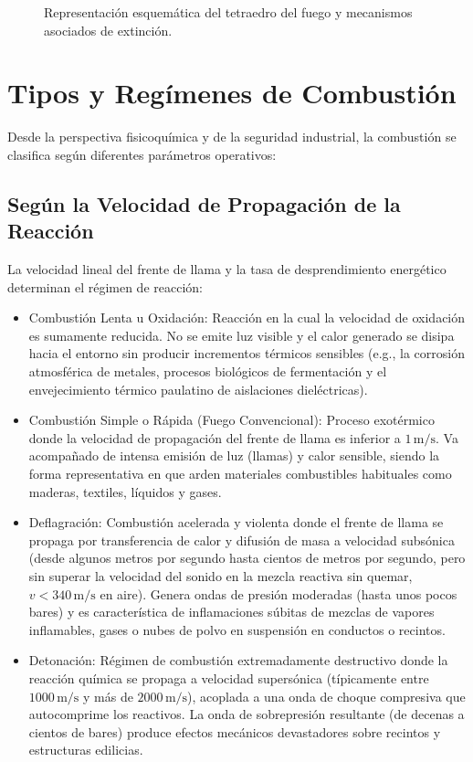 \begin{figure}[!ht]
    \centering
    
    \caption{Representación esquemática del tetraedro del fuego y mecanismos asociados de extinción.}
    \label{fig.cap2:tetraedro}
\end{figure}

\section{Tipos y Regímenes de Combustión}
\label{sec.cap2:tipos_combustion}

Desde la perspectiva fisicoquímica y de la seguridad industrial, la combustión se clasifica según diferentes parámetros
operativos:

\subsection{Según la Velocidad de Propagación de la Reacción}

La velocidad lineal del frente de llama y la tasa de desprendimiento energético determinan el régimen de reacción:

\begin{itemize}
    \item Combustión Lenta u Oxidación: Reacción en la cual la velocidad de oxidación es sumamente reducida. No se emite
          luz visible y el calor generado se disipa hacia el entorno sin producir incrementos térmicos sensibles (e.g.,
          la corrosión atmosférica de metales, procesos biológicos de fermentación y el envejecimiento térmico paulatino
          de aislaciones dieléctricas).
    \item Combustión Simple o Rápida (Fuego Convencional): Proceso exotérmico donde la velocidad de propagación del frente
          de llama es inferior a $1\,\mathrm{m/s}$. Va acompañado de intensa emisión de luz (llamas) y calor sensible,
          siendo la forma representativa en que arden materiales combustibles habituales como maderas, textiles, líquidos y
          gases.
    \item Deflagración: Combustión acelerada y violenta donde el frente de llama se propaga por transferencia de calor y
          difusión de masa a velocidad subsónica (desde algunos metros por segundo hasta cientos de metros por segundo,
          pero sin superar la velocidad del sonido en la mezcla reactiva sin quemar, $v < 340\,\mathrm{m/s}$ en aire). Genera
          ondas de presión moderadas (hasta unos pocos bares) y es característica de inflamaciones súbitas de mezclas de
          vapores inflamables, gases o nubes de polvo en suspensión en conductos o recintos.
    \item Detonación: Régimen de combustión extremadamente destructivo donde la reacción química se propaga a velocidad
          supersónica (típicamente entre $1000\,\mathrm{m/s}$ y más de $2000\,\mathrm{m/s}$), acoplada a una onda de
          choque compresiva que autocomprime los reactivos. La onda de sobrepresión resultante (de decenas a cientos de
          bares) produce efectos mecánicos devastadores sobre recintos y estructuras edilicias.
\end{itemize}

